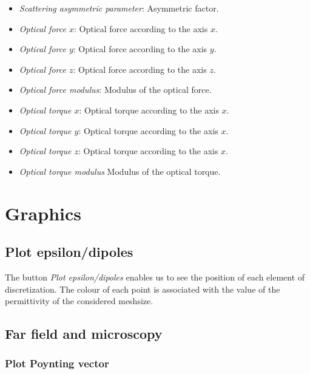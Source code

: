 \begin{itemize}
\item {\it Scattering asymmetric parameter}: Asymmetric factor.

\item {\it Optical force $x$}: Optical force according to the axis  $x$.

\item {\it Optical force $y$}: Optical force according to the axis  $y$.

\item {\it Optical force $z$}: Optical force according to the axis  $z$.

\item {\it Optical force modulus}: Modulus of the optical force.

\item {\it Optical torque $x$}:  Optical torque according to the axis  $x$.

\item {\it Optical  torque $y$}: Optical torque according to the axis  $x$.

\item {\it Optical  torque $z$}: Optical torque according to the axis  $x$.

\item {\it Optical torque modulus} Modulus of the optical torque.

\end{itemize}

\section{Graphics}

\subsection{Plot epsilon/dipoles}

The button {\it Plot epsilon/dipoles} enables us to see the position
of each element of discretization. The colour of each point is
associated with the value of the permittivity of the considered
meshsize.


\subsection{Far field and microscopy}

\subsubsection{Plot Poynting vector}

